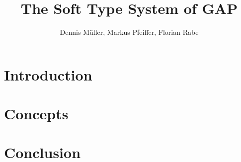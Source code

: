 \documentclass[a4paper]{article}
\begin{document}
\title{The Soft Type System of GAP}
\author{Dennis Müller, Markus Pfeiffer, Florian Rabe}
\maketitle

\begin{abstract}
  
\end{abstract}

\section{Introduction}
  

\section{Concepts}
  

\section{Conclusion}
  




\end{document}
